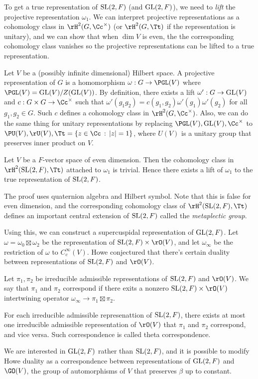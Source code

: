 To get a true representation of $\mathrm{SL}(2, F)$ (and $\mathrm{GL}(2, F)$), we need to \emph{lift} the projective representation $\omega_1$. 
We can interpret projective representations as a cohomology class in $\rH^{2}(G, \Cc^{\times})$ (or $\rH^{2}(G, \Tt)$ if the representation is unitary), and we can show that when $\dim V$ is even, the the corresponding cohomology class vanishes so the projective representations can be lifted to a true representation. 
\begin{definition}
Let $V$ be a (possibly infinite dimensional) Hilbert space. 
A projective representation of $G$ is a homomorphism $\omega : G\to \PGL(V)$ where $\PGL(V) = \GL(V)/Z(\GL(V))$. By definition, there exists a lift $\omega' : G\to \mathrm{GL}(V)$ and $c:G\times G\to \Cc^{\times}$ such that $\omega'(g_{1}g_{2}) = c(g_{1}, g_{2})\omega'(g_{1})\omega'(g_{2})$ for all $g_{1}, g_{2}\in G$. 
Such $c$ defines a cohomology class in $\rH^{2}(G, \Cc^{\times})$. 
Also, we can do the same thing for unitary representations by replacing $\PGL(V), \GL(V), \Cc^{\times}$ to $\PU(V), \rU(V), \Tt = \{z\in \Cc\,:\, |z| = 1\}$, where $U(V)$ is a unitary group that preserves inner product on $V$. 
\end{definition}

\begin{theorem}
Let $V$ be a $F$-vector space of even dimension. Then the cohomology class in $\rH^{2}(\SL(2, F), \Tt)$ attached to $\omega_1$ is trivial. 
Hence there exists a lift of $\omega_1$ to the true representation of $\mathrm{SL}(2, F)$.  
\end{theorem}
The proof uses quaternion algebra and Hilbert symbol. 
Note that this is false for even dimension, and the corresponding cohomology class of $\rH^{2}(\SL(2, F), \Tt)$ defines an important central extension of $\mathrm{SL}(2, F)$ called the \emph{metaplectic group}. 

Using this, we can construct a supercuspidal representation of $\mathrm{GL}(2, F)$. 
Let $\omega = \omega_{0}\boxtimes \omega_{2}$ be the representation of $\SL(2, F)\times \rO(V)$, and let $\omega_\infty$ be the restriction of $\omega$ to $C_{c}^{\infty}(V)$. 
Howe conjectured that there's certain duality between representations of $\mathrm{SL}(2, F)$ and $\rO(V)$. 
\begin{definition}
Let $\pi_1, \pi_2$ be irreducible admissible representations of $\mathrm{SL}(2, F)$ and $\rO(V)$. 
We say that $\pi_1$ and $\pi_2$ correspond if there exits a nonzero $\SL(2, F)\times \rO(V)$ intertwining operator $\omega_\infty \to \pi_1\boxtimes \pi_2$. 
\end{definition}
\begin{theorem}
For each irreducible admissible represenattion of $\mathrm{SL}(2, F)$, there exists at most one irreducible admissible representation of $\rO(V)$ that $\pi_1$ and $\pi_2$ correspond, and vice versa. 
Such correspondence is called theta correspondence. 
\end{theorem}
We are interested in $\mathrm{GL}(2, F)$ rather than $\mathrm{SL}(2, F)$, and it is possible to modify Howe duality as a correspondence between representations of $\mathrm{GL}(2, F)$ and $\GO(V)$, the group of automorphisms of $V$ that preserves $\beta$ up to constant. 

